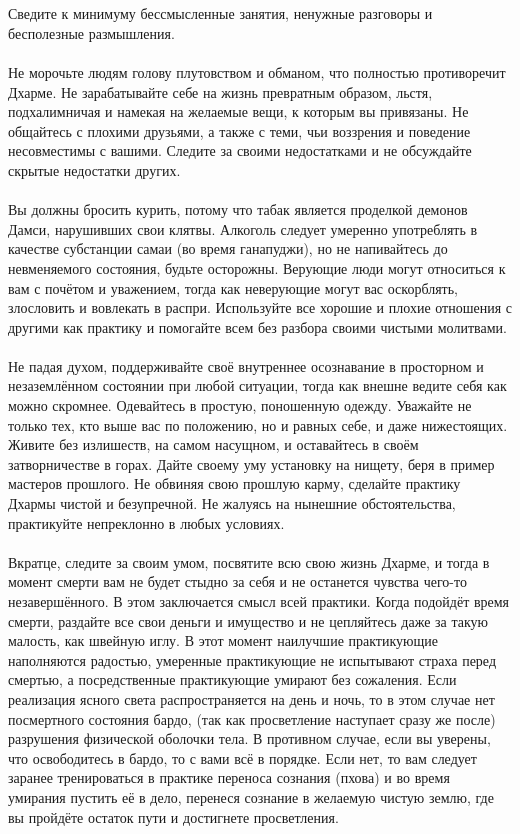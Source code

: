 \\ \\ Сведите к минимуму бессмысленные занятия, ненужные разговоры и бесполезные размышления.
\\ \\ Не морочьте людям голову плутовством и обманом, что полностью противоречит Дхарме. Не зарабатывайте себе на жизнь превратным образом, льстя, подхалимничая и намекая на желаемые вещи, к которым вы привязаны. Не общайтесь с плохими друзьями, а также с теми, чьи воззрения и поведение несовместимы с вашими. Следите за своими недостатками и не обсуждайте скрытые недостатки других.
\\ \\ Вы должны бросить курить, потому что табак является проделкой демонов Дамси, нарушивших свои клятвы. Алкоголь следует умеренно употреблять в качестве субстанции самаи (во время ганапуджи), но не напивайтесь до невменяемого состояния, будьте осторожны.
\newpage
Верующие люди могут относиться к вам с почётом и уважением, тогда как неверующие могут вас оскорблять, злословить и вовлекать в распри. Используйте все хорошие и плохие отношения с другими как практику и помогайте всем без разбора своими чистыми молитвами.
\\ \\ Не падая духом, поддерживайте своё внутреннее осознавание в просторном и незаземлённом состоянии при любой ситуации, тогда как внешне ведите себя как можно скромнее. Одевайтесь в простую, поношенную одежду. Уважайте не только тех, кто выше вас по положению, но и равных себе, и даже нижестоящих. Живите без излишеств, на самом насущном, и оставайтесь в своём затворничестве в горах. Дайте своему уму установку на нищету, беря в пример мастеров прошлого. Не обвиняя свою прошлую карму, сделайте практику Дхармы чистой и безупречной. Не жалуясь на нынешние обстоятельства, практикуйте непреклонно в любых условиях.
\\ \\ Вкратце, следите за своим умом, посвятите всю свою жизнь Дхарме, и тогда в момент смерти вам не будет стыдно за себя и не останется чувства чего-то незавершённого. В этом заключается смысл всей практики. Когда подойдёт время смерти, раздайте все свои деньги и имущество и не цепляйтесь даже за такую малость, как швейную иглу. В этот момент наилучшие практикующие наполняются радостью, умеренные практикующие не испытывают страха перед смертью, а посредственные практикующие умирают без сожаления. Если реализация ясного света распространяется на день и ночь, то в этом случае нет посмертного состояния бардо, (так как просветление наступает сразу же после) разрушения физической оболочки тела. В противном случае, если вы уверены, что освободитесь в бардо, то с вами всё в порядке. Если нет, то вам следует заранее тренироваться в практике переноса сознания (пхова) и во время умирания пустить её в дело, перенеся сознание в желаемую чистую землю, где вы пройдёте остаток пути и достигнете просветления.

